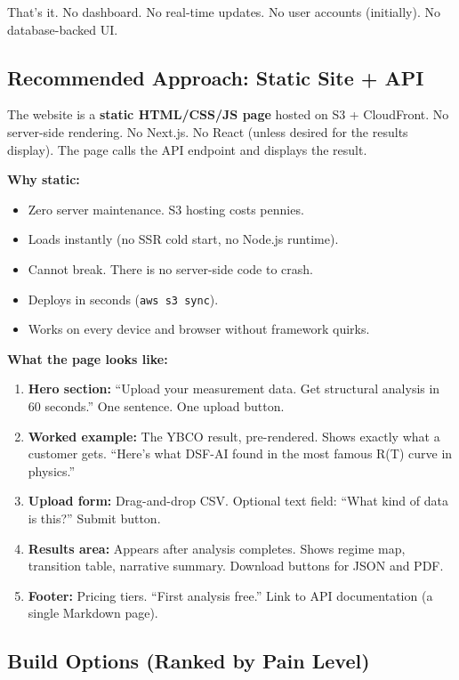 \documentclass[11pt,letterpaper]{article}
\begin{document}
That's it. No dashboard. No real-time updates. No user accounts
(initially). No database-backed UI.

\subsection{Recommended Approach: Static Site + API}

The website is a \textbf{static HTML/CSS/JS page} hosted on S3 +
CloudFront. No server-side rendering. No Next.js. No React (unless
desired for the results display). The page calls the API endpoint
and displays the result.

\textbf{Why static:}
\begin{itemize}
  \item Zero server maintenance. S3 hosting costs pennies.
  \item Loads instantly (no SSR cold start, no Node.js runtime).
  \item Cannot break. There is no server-side code to crash.
  \item Deploys in seconds (\texttt{aws s3 sync}).
  \item Works on every device and browser without framework quirks.
\end{itemize}

\textbf{What the page looks like:}
\begin{enumerate}
  \item \textbf{Hero section:} ``Upload your measurement data.
    Get structural analysis in 60 seconds.'' One sentence. One
    upload button.
  \item \textbf{Worked example:} The YBCO result, pre-rendered.
    Shows exactly what a customer gets. ``Here's what DSF-AI found
    in the most famous R(T) curve in physics.''
  \item \textbf{Upload form:} Drag-and-drop CSV. Optional text
    field: ``What kind of data is this?'' Submit button.
  \item \textbf{Results area:} Appears after analysis completes.
    Shows regime map, transition table, narrative summary.
    Download buttons for JSON and PDF.
  \item \textbf{Footer:} Pricing tiers. ``First analysis free.''
    Link to API documentation (a single Markdown page).
\end{enumerate}

\subsection{Build Options (Ranked by Pain Level)}
\end{document}
